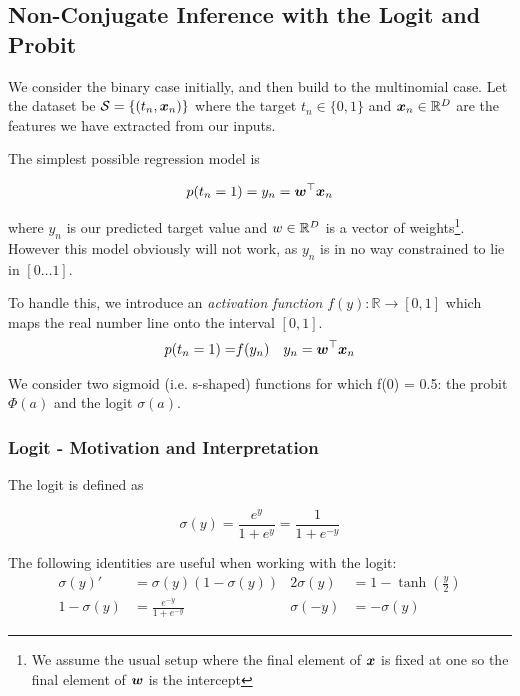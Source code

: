 


\subsection{Non-Conjugate Inference with the Logit and Probit}
\label{sec:nonconj}
We consider the binary case initially, and then build to the multinomial case. Let the dataset be $\mathcal{S} = \{(t_n, \bm x_n)\}$ where the target $t_n \in \{0,1\}$ and $\bm x_n \in { \mathbb{R}^{D} }$ are the features we have extracted from our inputs.

The simplest possible regression model is 

\begin{equation*}
p(t_n = 1) = y_n = \bm w^\top\bm x_n
\end{equation*}

where $y_n$ is our predicted target value and $w \in { \mathbb{R}^{D} }$ is a vector of weights\footnote{We assume the usual setup where the final element of $\bm x$ is fixed at one so the final element of $\bm w$ is the intercept}. However this model obviously will not work, as $y_n$ is in no way constrained to lie in $[0 \ldots 1]$.

To handle this, we introduce an \emph{activation function} $f(y) : \mathbb{R} \rightarrow [0, 1]$ which maps the real number line onto the interval $[0,1]$.
\begin{align*}
p(t_n = 1) = & f(y_n) & y_n  & = \bm w^\top\bm x_n \\
\end{align*}

We consider two sigmoid (i.e. s-shaped) functions for which f(0) = 0.5: the probit $\Phi(a)$ and the logit $\sigma(a)$.

\subsubsection{Logit - Motivation and Interpretation}
The logit is defined as

\begin{equation}
\sigma(y) = \frac{e^y}{1 + e^{y}} = \frac{1}{1+e^{-y}}
\end{equation}

The following identities are useful when working with the logit:
\begin{align}
\sigma(y)' & = \sigma(y)(1 - \sigma(y)) \label{eqn:sigma-identity} &
2 \sigma(y) & = 1 - \tanh (\frac{y}{2}) \\
1 - \sigma(y) & = \frac{e^{-y}}{1 + e^{-y}} &
\sigma(-y) & = -\sigma(y)
\end{align}


